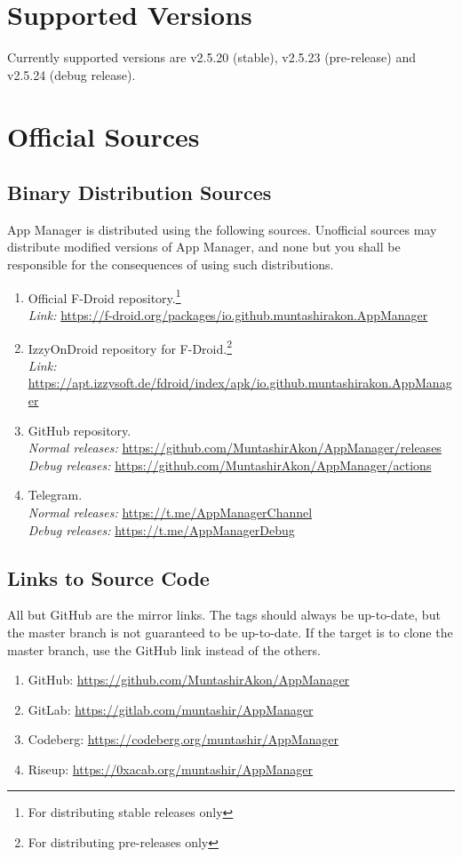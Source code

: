 \section{Supported Versions}\label{sec:supported-versions}
Currently supported versions are v2.5.20 (stable), v2.5.23 (pre-release) and v2.5.24 (debug release).

\section{Official Sources}\label{sec:official-sources}

\subsection{Binary Distribution Sources}\label{subsec:binary-distribution-sources}
App Manager is distributed using the following sources. Unofficial sources may distribute modified versions of App
Manager, and none but you shall be responsible for the consequences of using such distributions.
\begin{enumerate}
    \item Official F-Droid repository.\footnote{For distributing stable releases only}\\
    \textit{Link:} \url{https://f-droid.org/packages/io.github.muntashirakon.AppManager}
    \item IzzyOnDroid repository for F-Droid.\footnote{For distributing pre-releases only}\\
    \textit{Link:} \url{https://apt.izzysoft.de/fdroid/index/apk/io.github.muntashirakon.AppManager}
    \item GitHub repository.\\
    \textit{Normal releases:} \url{https://github.com/MuntashirAkon/AppManager/releases}\\
    \textit{Debug releases:} \url{https://github.com/MuntashirAkon/AppManager/actions}
    \item Telegram.\\
    \textit{Normal releases:} \url{https://t.me/AppManagerChannel}\\
    \textit{Debug releases:} \url{https://t.me/AppManagerDebug}
\end{enumerate}

\subsection{Links to Source Code}\label{subsec:links-to-source-code}
All but GitHub are the mirror links. The tags should always be up-to-date, but the master branch is not guaranteed to be
up-to-date. If the target is to clone the master branch, use the GitHub link instead of the others.
\begin{enumerate}
    \item GitHub: \url{https://github.com/MuntashirAkon/AppManager}
    \item GitLab: \url{https://gitlab.com/muntashir/AppManager}
    \item Codeberg: \url{https://codeberg.org/muntashir/AppManager}
    \item Riseup: \url{https://0xacab.org/muntashir/AppManager}
\end{enumerate}

